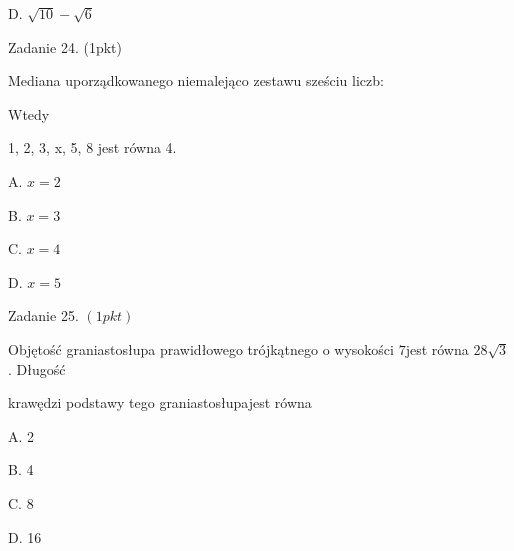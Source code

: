 \documentclass[a4paper,12pt]{article}
\begin{document}
D. $\sqrt{10}-\sqrt{6}$

Zadanie 24. (1pkt)

Mediana uporządkowanego niemalejąco zestawu sześciu liczb:

Wtedy

1, 2, 3, x, 5, 8 jest równa 4.

A. $x=2$

B. $x=3$

C. $x=4$

D. $x=5$

Zadanie 25. $(1pkt)$

Objętość graniastosłupa prawidłowego trójkątnego o wysokości $7$jest równa $28\sqrt{3}$. Długość

krawędzi podstawy tego graniastosłupajest równa

A. 2

B. 4

C. 8

D. 16
\end{document}
